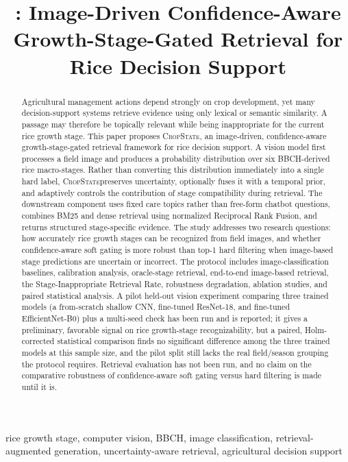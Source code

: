 \documentclass[conference]{IEEEtran}
\title{\method: Image-Driven Confidence-Aware Growth-Stage-Gated Retrieval for Rice Decision Support}
\author{\IEEEauthorblockN{L\^e B\hspace{0.05em}a\hspace{0.05em}o Nhi}
\IEEEauthorblockA{FPT University\\
Da Nang, Vietnam\\
lebaonhi0805@gmail.com}}
\newcommand{\method}{\textsc{CropState}}
\begin{document}
\maketitle

\begin{abstract}
Agricultural management actions depend strongly on crop development, yet many decision-support systems retrieve evidence using only lexical or semantic similarity. A passage may therefore be topically relevant while being inappropriate for the current rice growth stage. This paper proposes \method, an image-driven, confidence-aware growth-stage-gated retrieval framework for rice decision support. A vision model first processes a field image and produces a probability distribution over six BBCH-derived rice macro-stages. Rather than converting this distribution immediately into a single hard label, \method preserves uncertainty, optionally fuses it with a temporal prior, and adaptively controls the contribution of stage compatibility during retrieval. The downstream component uses fixed care topics rather than free-form chatbot questions, combines BM25 and dense retrieval using normalized Reciprocal Rank Fusion, and returns structured stage-specific evidence. The study addresses two research questions: how accurately rice growth stages can be recognized from field images, and whether confidence-aware soft gating is more robust than top-1 hard filtering when image-based stage predictions are uncertain or incorrect. The protocol includes image-classification baselines, calibration analysis, oracle-stage retrieval, end-to-end image-based retrieval, the Stage-Inappropriate Retrieval Rate, robustness degradation, ablation studies, and paired statistical analysis. A pilot held-out vision experiment comparing three trained models (a from-scratch shallow CNN, fine-tuned ResNet-18, and fine-tuned EfficientNet-B0) plus a multi-seed check has been run and is reported; it gives a preliminary, favorable signal on rice growth-stage recognizability, but a paired, Holm-corrected statistical comparison finds no significant difference among the three trained models at this sample size, and the pilot split still lacks the real field/season grouping the protocol requires. Retrieval evaluation has not been run, and no claim on the comparative robustness of confidence-aware soft gating versus hard filtering is made until it is.
\end{abstract}

\begin{IEEEkeywords}
rice growth stage, computer vision, BBCH, image classification, retrieval-augmented generation, uncertainty-aware retrieval, agricultural decision support
\end{IEEEkeywords}
\end{document}
